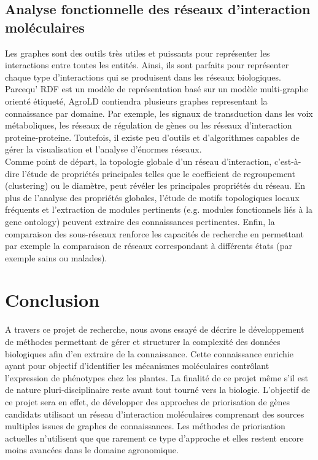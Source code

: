 \subsection{Analyse fonctionnelle des réseaux d'interaction moléculaires}
Les graphes sont des outils très utiles et puissants pour représenter les interactions entre toutes les entités. Ainsi, ils sont parfaits pour représenter chaque type d'interactions qui se produisent dans les réseaux biologiques. Parcequ' RDF est un modèle de représentation basé sur un modèle multi-graphe orienté étiqueté, AgroLD contiendra plusieurs graphes representant la connaissance par domaine. Par exemple, les signaux de transduction dans les voix métaboliques, les réseaux de régulation de gènes ou les réseaux d'interaction proteine-proteine. Toutefois, il existe peu d'outils et d'algorithmes capables de gérer la visualisation et l'analyse d'énormes réseaux. \\
Comme point de départ, la topologie globale d'un réseau d'interaction, c'est-à-dire l'étude de propriétés principales telles que le coefficient de regroupement (clustering) ou le diamètre, peut révéler les principales propriétés du réseau. En plus de l'analyse des propriétés globales, l'étude de motifs topologiques locaux fréquents et l'extraction de modules pertinents (e.g. modules fonctionnels liés à la gene ontology) peuvent extraire des connaissances pertinentes. Enfin, la comparaison des sous-réseaux renforce les capacités de recherche en permettant par exemple la comparaison de réseaux correspondant à différents états (par exemple sains ou malades).

\section{Conclusion}
A travers ce projet de recherche, nous avons essayé de décrire le développement de méthodes permettant de gérer et structurer la complexité des données biologiques afin d'en extraire de la connaissance. Cette connaissance enrichie ayant pour objectif d’identifier les mécanismes moléculaires contrôlant l’expression de phénotypes chez les plantes. La finalité de ce projet même s'il est de nature pluri-disciplinaire reste avant tout tourné vers la biologie. L’objectif de ce projet sera en effet, de développer des approches de priorisation de gènes candidats utilisant un réseau d’interaction moléculaires comprenant des sources multiples issues de graphes de connaissances. Les méthodes de priorisation actuelles n'utilisent que que rarement ce type d'approche et elles restent encore moins avancées dans le domaine agronomique. 

